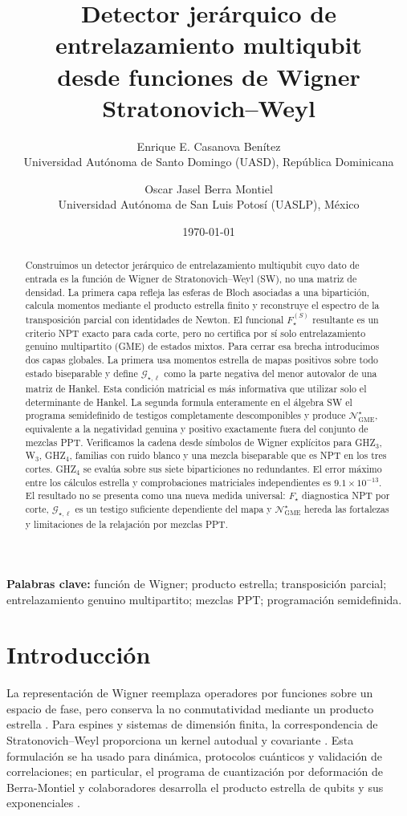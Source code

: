 \documentclass[11pt,a4paper]{article}
\title{Detector jerárquico de entrelazamiento multiqubit\\
desde funciones de Wigner Stratonovich--Weyl}
\author{Enrique E. Casanova Benítez\\
\small Universidad Autónoma de Santo Domingo (UASD), República Dominicana
\and
Oscar Jasel Berra Montiel\\
\small Universidad Autónoma de San Luis Potosí (UASLP), México}
\date{\today}
\theoremstyle{definition}
\begin{document}
\maketitle

\begin{abstract}
Construimos un detector jerárquico de entrelazamiento multiqubit cuyo dato de
entrada es la función de Wigner de Stratonovich--Weyl (SW), no una matriz de
densidad. La primera capa refleja las esferas de Bloch asociadas a una
bipartición, calcula momentos mediante el producto estrella finito y reconstruye
el espectro de la transposición parcial con identidades de Newton. El funcional
$F_{\star}^{(S)}$ resultante es un criterio NPT exacto para cada corte, pero no
certifica por sí solo entrelazamiento genuino multipartito (GME) de estados
mixtos. Para cerrar esa brecha introducimos dos capas globales. La primera usa
momentos estrella de mapas positivos sobre todo estado biseparable y define
$\mathcal G_{\star,\ell}$ como la parte negativa del menor autovalor de una
matriz de Hankel. Esta condición matricial es más informativa que utilizar solo
el determinante de Hankel. La segunda formula enteramente en el álgebra SW el
programa semidefinido de testigos completamente descomponibles y produce
$\mathcal N_{\mathrm{GME}}^{\star}$, equivalente a la negatividad genuina y
positivo exactamente fuera del conjunto de mezclas PPT. Verificamos la cadena
desde símbolos de Wigner explícitos para GHZ$_3$, W$_3$, GHZ$_4$, familias con
ruido blanco y una mezcla biseparable que es NPT en los tres cortes. GHZ$_4$
se evalúa sobre sus siete biparticiones no redundantes. El error máximo entre los
cálculos estrella y comprobaciones matriciales independientes es
$9.1\times10^{-13}$. El resultado no se presenta como una nueva medida universal:
$F_{\star}$ diagnostica NPT por corte, $\mathcal G_{\star,\ell}$ es un testigo
suficiente dependiente del mapa y $\mathcal N_{\mathrm{GME}}^{\star}$ hereda las
fortalezas y limitaciones de la relajación por mezclas PPT.
\end{abstract}

\noindent\textbf{Palabras clave:} función de Wigner; producto estrella;
transposición parcial; entrelazamiento genuino multipartito; mezclas PPT;
programación semidefinida.

\section{Introducción}

La representación de Wigner reemplaza operadores por funciones sobre un espacio
de fase, pero conserva la no conmutatividad mediante un producto estrella
\cite{Wigner1932,Groenewold1946,Moyal1949}. Para espines y sistemas de dimensión
finita, la correspondencia de Stratonovich--Weyl proporciona un kernel
autodual y covariante \cite{Stratonovich1957,Tilma2016ArbitraryWigner,
RundleEveritt2021Overview}. Esta formulación se ha usado para dinámica,
protocolos cuánticos y validación de correlaciones; en particular, el programa
de cuantización por deformación de Berra-Montiel y colaboradores desarrolla el
producto estrella de qubits y sus exponenciales
\cite{SanchezCordovaBerraMontiel2024QET,BerraMontiel2026StarDynamics}.
\end{document}
